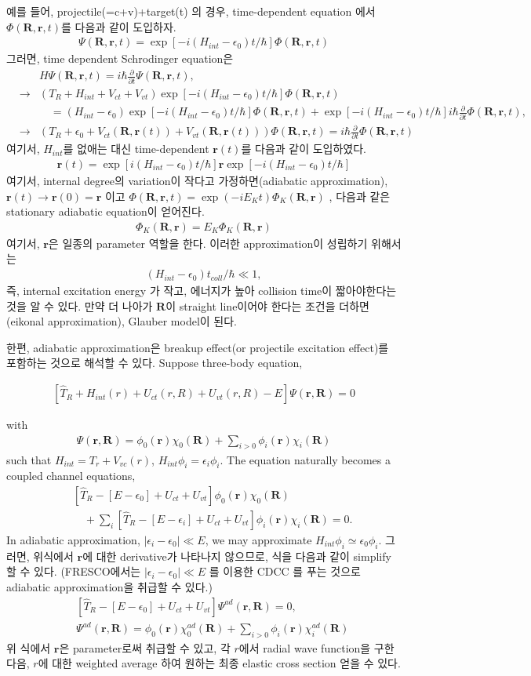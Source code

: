 \documentclass[11pt]{book}
\def\bm{\boldsymbol}
\def\vr{{\bm r}}
\def\vR{{\bm R}}
\newcommand{\bea}{\begin{eqnarray}}
\newcommand{\eea}{\end{eqnarray}}
\newcommand{\no}{\nonumber \\}
\newcommand{\del}{\partial}
\begin{document}
예를 들어, projectile(=c+v)+target(t) 의 경우, 
time-dependent equation 에서 $\Phi(\vR,\vr,t)$를 다음과 같이 도입하자.
\bea 
\Psi(\vR,\vr,t)=\exp[-i(H_{int}-\epsilon_0)t/\hbar]\Phi(\vR,\vr,t) 
\eea 
그러면, time dependent Schrodinger equation은 
\bea 
& &H\Psi(\vR,\vr,t)=i\hbar\frac{\del}{\del t} \Psi(\vR,\vr,t) , \no 
&\to& (T_R+H_{int}+V_{ct}+V_{vt})\exp[-i(H_{int}-\epsilon_0)t/\hbar]\Phi(\vR,\vr,t)
    \no & &\quad 
     =(H_{int}-\epsilon_0)\exp[-i(H_{int}-\epsilon_0)t/\hbar]\Phi(\vR,\vr,t)
      +\exp[-i(H_{int}-\epsilon_0)t/\hbar] i\hbar\frac{\del}{\del t}\Phi(\vR,\vr,t)
     ,\no 
&\to & (T_R+\epsilon_0+V_{ct}(\vR,\vr(t))+V_{vt}(\vR,\vr(t)))\Phi(\vR,\vr,t)
     = i\hbar\frac{\del}{\del t}\Phi(\vR,\vr,t)       
\eea 
여기서, $H_{int}$를 없애는 대신 time-dependent $\vr(t)$를 다음과 같이 도입하였다.
\bea 
\vr(t)=\exp[i(H_{int}-\epsilon_0)t/\hbar]\vr \exp[-i(H_{int}-\epsilon_0)t/\hbar]
\eea 
여기서, internal degree의 variation이 작다고 가정하면(adiabatic approximation), 
$\vr(t)\to \vr(0)=\vr$ 이고 $\Phi(\vR,\vr,t) = \exp(-i E_K t)\Phi_K(\vR,\vr)$
, 다음과 같은 stationary adiabatic equation이 얻어진다. 
\bea 
[\hat{T}_R+\epsilon_0+U_{ct}(\vr,{\bm R})+U_{vt}(\vr,{\bm R})]\Phi_K(\vR,\vr)=E_K \Phi_K(\vR,\vr)
\eea 
여기서, $\vr$은 일종의 parameter 역할을 한다. 이러한 approximation이 성립하기 위해서는 
\bea 
(H_{int}-\epsilon_0) t_{coll}/\hbar \ll 1,
\eea 
즉, internal excitation energy 가 작고, 에너지가 높아 collision time이 짧아야한다는 것을 
알 수 있다. 만약 더 나아가 $\vR$이 straight line이어야 한다는 조건을 더하면(eikonal approximation), 
 Glauber model이 된다. 

한편, adiabatic approximation은 breakup effect(or projectile excitation effect)를 
포함하는 것으로 해석할 수 있다. Suppose three-body equation,
 
\bea 
\boxed{ 
[\hat{T}_R+H_{int}(r)+U_{ct}(r,R)+U_{vt}(r,R)-E]\Psi(\vr,\vR)=0
}
\eea 

with 
\bea 
\Psi(\vr,\vR)=\phi_0(\vr)\chi_0(\vR)+\sum_{i>0} \phi_i(\vr)\chi_i(\vR)
\eea 
such that $H_{int}=T_r+V_{vc}(r)$, $H_{int}\phi_i=\epsilon_i \phi_i$. 
The equation naturally becomes a coupled channel equations,
\bea 
& &[\hat{T}_R-[E-\epsilon_0]+U_{ct}+U_{vt}]\phi_0(\vr)\chi_0(\vR) \no 
& &\quad +\sum_i [\hat{T}_R-[E-\epsilon_i]+U_{ct}+U_{vt}]\phi_i(\vr)\chi_i(\vR)=0.
\eea 
In adiabatic approximation, $|\epsilon_i-\epsilon_0|\ll E$, we may approximate
$H_{int}\phi_i\simeq \epsilon_0 \phi_i$. 그러면, 위식에서 $\vr$에 대한 derivative가 나타나지
않으므로, 식을 다음과 같이 simplify 할 수 있다. (FRESCO에서는 $|\epsilon_i-\epsilon_0|\ll E$
를 이용한 CDCC 를 푸는 것으로 adiabatic approximation을 취급할 수 있다.)
\bea 
& &[\hat{T}_R-[E-\epsilon_0]+U_{ct}+U_{vt}]\Psi^{ad}(\vr,\vR)=0,\no 
& &\Psi^{ad}(\vr,\vR)=\phi_0(\vr)\chi_0^{ad}(\vR)+\sum_{i>0} \phi_i(\vr)\chi_i^{ad}(\vR) 
\eea 
위 식에서 $\vr$은 parameter로써 취급할 수 있고, 각 $r$에서 radial wave function을 구한 다음, 
$r$에 대한 weighted average 하여 원하는 최종 elastic cross section 얻을 수 있다. 
\end{document}
